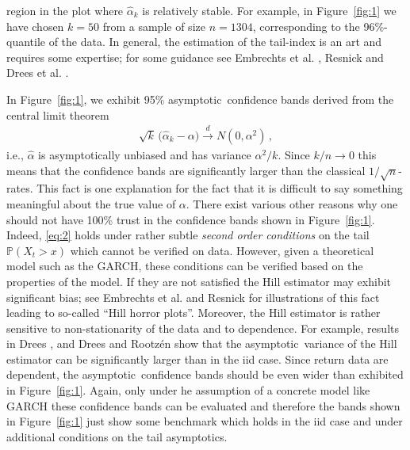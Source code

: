 \documentclass[11pt,a4]{amsart}
\newcommand{\clt}{central limit theorem}
\newcommand{\asy}{asymptotic}
\newcommand{\beam}{\begin{eqnarray}}
\newcommand{\eeam}{\end{eqnarray}\noindent}
\newcommand{\std}{\stackrel{d}{\rightarrow}}
\renewcommand{\P }{{\mathbb P}}
\newcommand{\1}{{\mathbf 1}}
\begin{document}
region in the plot where $\hat \alpha_k$ is relatively
stable. For example, in Figure~\ref{fig:1} we have chosen $k=50$ from
a sample of size $n=1304$, corresponding to the 96\%-quantile of the
data. In general, the estimation of the tail-index is an art and
requires some expertise; for some guidance
see Embrechts et al. \cite{embrechts:klueppelberg:mikosch:1997},
Resnick \cite{resnick:2007} and Drees et al. 
\cite{drees:resnick:2000}. 
\par
In Figure~\ref{fig:1},
we exhibit 95\% \asy\ confidence bands derived from  the \clt
\beam\label{eq:2}
\sqrt k\, \big(\hat \alpha_k - \alpha\big) \std N(0, \alpha^2)\,,
\eeam
i.e., $\hat \alpha$ is \asy ally unbiased and has variance
$\alpha^2/k$. Since $k/n\to 0$ this means that the 
confidence bands are significantly larger than the classical
$1/\sqrt{n}$-rates. This fact is one explanation for the fact that it is
difficult to say something meaningful about the true value of
$\alpha$. There exist various other reasons why one should
not have 100\% trust in the confidence bands shown in
Figure~\ref{fig:1}. Indeed, \eqref{eq:2}
holds under rather subtle {\em second order conditions} on the tail
$\P(X_t>x)$ which cannot be verified on data. However, 
given a theoretical model such as the GARCH, these conditions can be
verified based on the properties of the model. If they are not satisfied the 
Hill estimator may exhibit significant bias; see Embrechts et
al. \cite{embrechts:klueppelberg:mikosch:1997} and Resnick \cite{resnick:1987} for illustrations 
of this fact leading to so-called ``Hill horror plots''. Moreover, the
Hill estimator is rather sensitive to non-stationarity 
of the data and to dependence. For example, results in Drees \cite{drees:2008}, and Drees and
Rootz\'en \cite{drees:rootzen:2010} show that the \asy\ variance of the
Hill estimator can be significantly larger than in the iid case. 
Since return data are dependent, the \asy\ confidence bands should be
even wider than exhibited in Figure~\ref{fig:1}. 
Again, only under he assumption of a concrete model like GARCH these
confidence bands can be evaluated and therefore the bands shown in Figure~\ref{fig:1}
just show some benchmark which holds in the iid case and under additional conditions on the tail \asy s.
\end{document}
